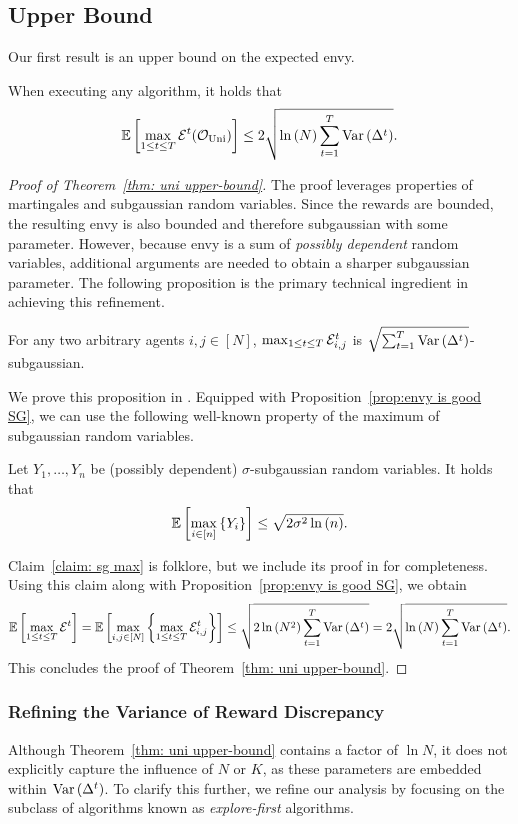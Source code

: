 \subsection{Upper Bound}\label{subsec:uni upper}
Our first result is an upper bound on the expected envy.
\begin{theorem}\label{thm: uni upper-bound}
When executing any algorithm, it holds that
\[\mathbb{E}\left[ \max_{1\leq t \leq T} \mathcal{E}^t (\mathcal O_{\textnormal{Uni}}) \right] \leq 2\sqrt{\ln{(N)} \sum^{T}_{t=1}{\mathrm{Var}\left( {\Delta^t} \right)} }.\]
\end{theorem}
\begin{proof}[Proof of Theorem~\ref{thm: uni upper-bound}]
The proof leverages properties of martingales and subgaussian random variables. Since the rewards are bounded, the resulting envy is also bounded and therefore subgaussian with some parameter. However, because envy is a sum of \emph{possibly dependent} random variables, additional arguments are needed to obtain a sharper subgaussian parameter. The following proposition is the primary technical ingredient in achieving this refinement.
\begin{proposition}\label{prop:envy is good SG}
For any two arbitrary agents $i,j\in [N]$, $\max_{1\leq t \leq T} \mathcal{E}^t_{i,j}$ is $\sqrt{\sum^T_{t=1}{\mathrm{Var}\left( {\Delta^t} \right)}}$-subgaussian.
\end{proposition}
We prove this proposition in . Equipped with Proposition~\ref{prop:envy is good SG}, we can use the following well-known property of the maximum of subgaussian random variables.
\begin{claim}\label{claim: sg max}
    Let $Y_1, \ldots, Y_n$ be (possibly dependent) $\sigma$-subgaussian random variables. It holds that
    \[
    \mathbb{E}\left[ \max_{i \in [n]}{\{Y_i\}}  \right] \leq \sqrt{2\sigma^2 \ln{(n)} }.
    \]
\end{claim}
Claim~\ref{claim: sg max} is folklore, but we include its proof in  for completeness. Using this claim along with Proposition~\ref{prop:envy is good SG}, we obtain 
\[
\mathbb{E}\left[ \max_{1\leq t \leq T} \mathcal{E}^t \right] =
\mathbb{E}\left[ \max_{i,j \in [N]}{\left\{ {\max_{1\leq t \leq T} \mathcal{E}^t_{i,j}} \right\}} \right] \leq
\sqrt{2 \ln{(N^2)} \sum^{T}_{t=1}{\mathrm{Var}\left( {\Delta^t} \right)} } =
2\sqrt{\ln{(N)} \sum^{T}_{t=1}{\mathrm{Var}\left( {\Delta^t} \right)} }.
\]
This concludes the proof of Theorem~\ref{thm: uni upper-bound}.
\end{proof}
\subsubsection{Refining the Variance of Reward Discrepancy}
Although Theorem~\ref{thm: uni upper-bound} contains a factor of $\ln N$, it does not explicitly capture the influence of $N$ or $K$, as these parameters are embedded within $\mathrm{Var}\left( {\Delta^t} \right)$. To clarify this further, we refine our analysis by focusing on the subclass of algorithms known as \emph{explore-first} algorithms. 

